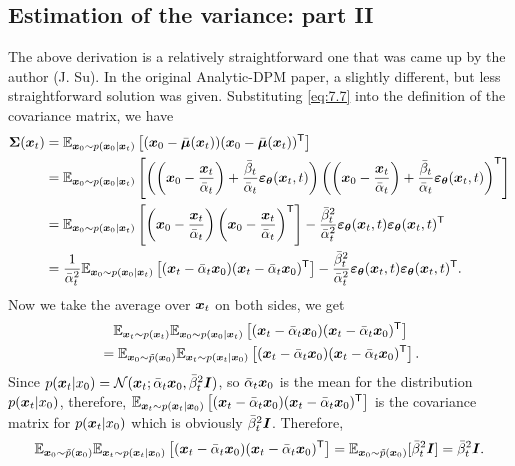 \subsection{Estimation of the variance: part II}
The above derivation is a relatively straightforward one that was came up by the author (J. Su). In the original Analytic-DPM paper, a slightly different, but less straightforward solution was given. Substituting \cref{eq:7.7} into the definition of the covariance matrix, we have
\begin{align}
    \bm{\Sigma}(\bm{x}_{t})&=\mathbb{E}_{\bm{x}_0\sim p(\bm{x}_0|\bm{x}_{t})} \left[(\bm{x}_0-\bar{\bm{\mu}}(\bm{x}_{t})) (\bm{x}_0-\bar{\bm{\mu}}(\bm{x}_{t}))^{\mathsf{T}} \right] \nonumber\\
    &=\mathbb{E}_{\bm{x}_0\sim p(\bm{x}_0|\bm{x}_{t})} \left[ \left( \left(\bm{x}_0-\frac{\bm{x}_{t}}{\bar{\alpha}_t}\right)+\frac{\bar{\beta}_t}{\bar{\alpha}_t}\bm{\varepsilon}_{\bm{\theta}}(\bm{x}_{t},t) \right) \left( \left(\bm{x}_0-\frac{\bm{x}_{t}}{\bar{\alpha}_t}\right)+\frac{\bar{\beta}_t}{\bar{\alpha}_t}\bm{\varepsilon}_{\bm{\theta}}(\bm{x}_{t},t) \right)^{\mathsf{T}}  \right]\nonumber\\
    &=\mathbb{E}_{\bm{x}_0\sim p(\bm{x}_0|\bm{x}_{t})} \left[  \left(\bm{x}_0-\frac{\bm{x}_{t}}{\bar{\alpha}_t}\right) \left(\bm{x}_0-\frac{\bm{x}_{t}}{\bar{\alpha}_t}\right)^{\mathsf{T}} \right] - \frac{\bar{\beta}_t^2}{\bar{\alpha}_t^2}\bm{\varepsilon}_{\bm{\theta}}(\bm{x}_{t},t)\bm{\varepsilon}_{\bm{\theta}}(\bm{x}_{t},t)^{\mathsf{T}}\nonumber\\
    &=\frac{1}{\bar{\alpha}_t^2}\mathbb{E}_{\bm{x}_0\sim p(\bm{x}_0|\bm{x}_{t})} \left[ (\bm{x}_{t}-\bar{\alpha}_t\bm{x}_0)(\bm{x}_{t}-\bar{\alpha}_t\bm{x}_0)^{\mathsf{T}} \right] -\frac{\bar{\beta}_t^2}{\bar{\alpha}_t^2}\bm{\varepsilon}_{\bm{\theta}}(\bm{x}_{t},t)\bm{\varepsilon}_{\bm{\theta}}(\bm{x}_{t},t)^{\mathsf{T}}.\label{eq:7.12}
\end{align}
Now we take the average over $\bm{x}_{t}$ on both sides, we get
\begin{align}
    &\quad \mathbb{E}_{\bm{x}_{t}\sim p(\bm{x}_{t})}\mathbb{E}_{\bm{x}_0\sim p(\bm{x}_0|\bm{x}_{t})}\left[ (\bm{x}_{t}-\bar{\alpha}_t\bm{x}_0)(\bm{x}_{t}-\bar{\alpha}_t\bm{x}_0)^{\mathsf{T}} \right]\nonumber\\
    &=\mathbb{E}_{\bm{x}_0\sim\tilde{p}(\bm{x}_0)}\mathbb{E}_{\bm{x}_{t}\sim p(\bm{x}_{t}|\bm{x}_0)} \left[ (\bm{x}_{t}-\bar{\alpha}_t\bm{x}_0)(\bm{x}_{t}-\bar{\alpha}_t\bm{x}_0)^{\mathsf{T}} \right]. \label{eq:7.13}
\end{align}
Since $p(\bm{x}_{t}|x_0)=\mathcal{N}(\bm{x}_{t};\bar{\alpha}_t\bm{x}_0,\bar{\beta}_t^2\bm{I})$, so $\bar{\alpha}_t\bm{x}_0$ is the mean for the distribution $p(\bm{x}_{t}|x_0)$, therefore, $\mathbb{E}_{\bm{x}_{t}\sim p(\bm{x}_{t}|\bm{x}_0)} \left[ (\bm{x}_{t}-\bar{\alpha}_t\bm{x}_0)(\bm{x}_{t}-\bar{\alpha}_t\bm{x}_0)^{\mathsf{T}} \right]$ is the covariance matrix for $p(\bm{x}_{t}|x_0)$ which is obviously $\bar{\beta}_t^2\bm{I}$. Therefore, 
\begin{equation}
    \label{7.14}
    \mathbb{E}_{\bm{x}_0\sim\tilde{p}(\bm{x}_0)}\mathbb{E}_{\bm{x}_{t}\sim p(\bm{x}_{t}|\bm{x}_0)} \left[ (\bm{x}_{t}-\bar{\alpha}_t\bm{x}_0)(\bm{x}_{t}-\bar{\alpha}_t\bm{x}_0)^{\mathsf{T}} \right] = \mathbb{E}_{\bm{x}_0\sim\tilde{p}(\bm{x}_0)} [\bar{\beta}_t^2\bm{I}]=\bar{\beta}_t^2\bm{I}. 
\end{equation}
